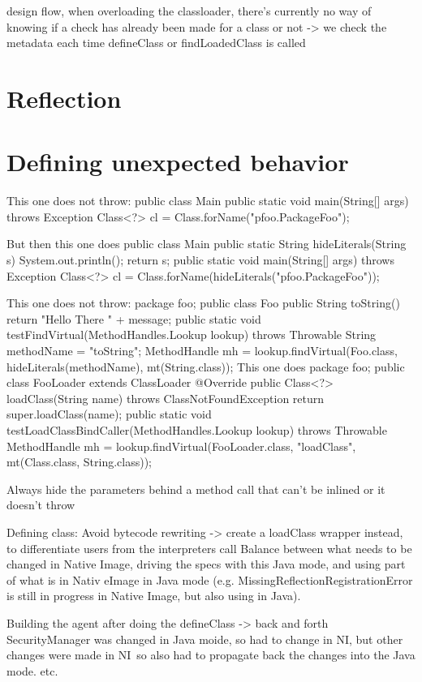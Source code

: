 design flow, when overloading the classloader, there's currently no way of knowing if a check has already been made for a class or not -> we check the metadata each time defineClass or findLoadedClass is called
\section{Reflection}

\section{Defining unexpected behavior}

This one does not throw:
public class Main {
    public static void main(String[] args) throws Exception {
        Class<?> cl = Class.forName("pfoo.PackageFoo");
    }
}

But then this one does
public class Main {
    public static String hideLiterals(String s) {
        System.out.println();
        return s;
    }
    public static void main(String[] args) throws Exception {
        Class<?> cl = Class.forName(hideLiterals("pfoo.PackageFoo"));
    }
}

This one does not throw:
package foo;
public class Foo {
    public String toString() {
        return "Hello There " + message;
    }
}
public static void testFindVirtual(MethodHandles.Lookup lookup) throws Throwable {
    String methodName = "toString";
    MethodHandle mh = lookup.findVirtual(Foo.class, hideLiterals(methodName), mt(String.class));
}
This one does
package foo;
public class FooLoader extends ClassLoader {
    @Override
    public Class<?> loadClass(String name) throws ClassNotFoundException {
        return super.loadClass(name);
    }
}
public static void testLoadClassBindCaller(MethodHandles.Lookup lookup) throws Throwable {
    MethodHandle mh = lookup.findVirtual(FooLoader.class, "loadClass", mt(Class.class, String.class));
}

Always hide the parameters behind a method call that can't be inlined or it doesn't throw


Defining class: Avoid bytecode rewriting -> create a loadClass wrapper instead, to differentiate users from the interpreters call
Balance between what needs to be changed in Native Image, driving the specs with this Java mode, and using part of what is in Nativ eImage in Java mode (e.g. 
MissingReflectionRegistrationError is still in progress in Native Image, but also using in Java).

Building the agent after doing the defineClass -> back and forth
SecurityManager was changed in Java moide, so had to change in NI, but other changes were made in NI so also had to propagate back the changes into the Java mode.
etc.

